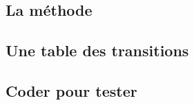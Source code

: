 \subsection{La méthode}

    


\subsection{Une table des transitions}

    


\subsection{Coder pour tester}

    
